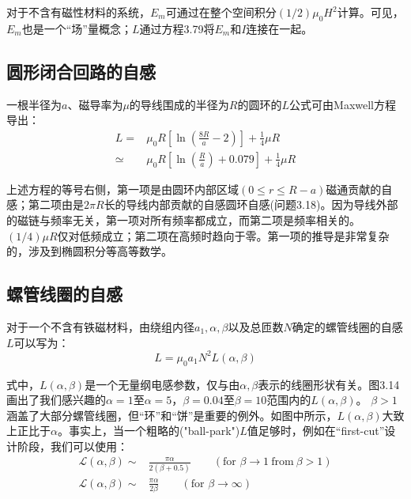 对于不含有磁性材料的系统，$E_m$可通过在整个空间积分$(1/2)\mu_0 H^2$计算。可见，$E_m$也是一个“场”量概念；$L$通过方程3.79将$E_m$和$I$连接在一起。

\subsection{圆形闭合回路的自感}
一根半径为$a$、磁导率为$\mu$的导线围成的半径为$R$的圆环的$L$公式可由Maxwell方程导出：
\begin{subequations}
	\begin{align}
L=&\mu_0R\left[\ln(\frac{8R}{a}-2)\right]+\frac{1}{4}\mu R \\
\simeq & \mu_0R\left[\ln(\frac{R}{a})+0.079\right]+\frac{1}{4}\mu R%
	\end{align}
\end{subequations}

上述方程的等号右侧，第一项是由圆环内部区域$(0\le r \le R-a)$磁通贡献的自感；第二项由是$2\pi R$长的导线内部贡献的自感圆环自感(问题3.18)。因为导线外部的磁链与频率无关，第一项对所有频率都成立，而第二项是频率相关的。$(1/4)\mu R$仅对低频成立；第二项在高频时趋向于零。第一项的推导是非常复杂的，涉及到椭圆积分等高等数学。

\subsection{螺管线圈的自感}
对于一个不含有铁磁材料，由绕组内径$a_1,\alpha,\beta$以及总匝数$N$确定的螺管线圈的自感$L$可以写为：
\begin{equation}
L=\mu_0a_1N^2L(\alpha,\beta)%
\end{equation}

式中，$L(\alpha,\beta)$是一个无量纲电感参数，仅与由$\alpha,\beta$表示的线圈形状有关。图3.14画出了我们感兴趣的$\alpha=1$至$\alpha=5$，$\beta=0.04$至$\beta=10$范围内的$L(\alpha,\beta)$。
$\beta>1$涵盖了大部分螺管线圈，但“环”和“饼”是重要的例外。如图中所示，$L(\alpha,\beta)$大致上正比于$\alpha$。事实上，当一个粗略的("ball-park")$L$值足够时，例如在“first-cut”设计阶段，我们可以使用：
\begin{subequations}
	\begin{align}
\mathcal{L}(\alpha,\beta)\sim&\frac{\pi\alpha}{2(\beta+0.5)} \qquad(\mbox{for } \beta\rightarrow 1\ \mbox{from}\ \beta>1)\\ 
\mathcal{L}(\alpha,\beta)\sim&\frac{\pi\alpha}{2\beta}\qquad (\mbox{for } \beta\rightarrow \infty)
	\end{align}
\end{subequations}

